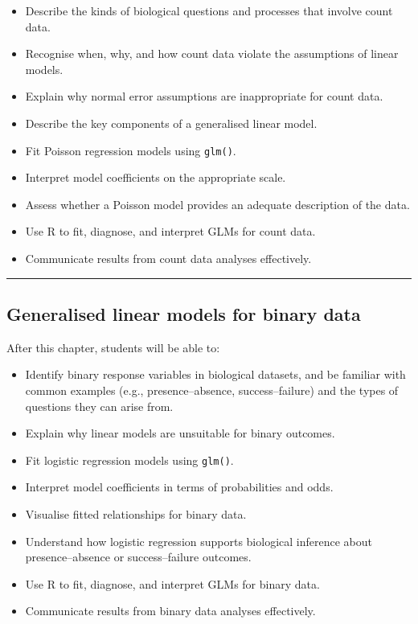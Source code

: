 \documentclass[
  letterpaper,
  8pt,
  a4paper]{book}
\providecommand{\tightlist}{%
  \setlength{\itemsep}{0pt}\setlength{\parskip}{0pt}}
\begin{document}
\begin{itemize}
\tightlist
\item
  Describe the kinds of biological questions and processes that involve
  count data.
\item
  Recognise when, why, and how count data violate the assumptions of
  linear models.
\item
  Explain why normal error assumptions are inappropriate for count data.
\item
  Describe the key components of a generalised linear model.
\item
  Fit Poisson regression models using \texttt{glm()}.
\item
  Interpret model coefficients on the appropriate scale.
\item
  Assess whether a Poisson model provides an adequate description of the
  data.
\item
  Use R to fit, diagnose, and interpret GLMs for count data.
\item
  Communicate results from count data analyses effectively.
\end{itemize}

\begin{center}\rule{0.5\linewidth}{0.5pt}\end{center}

\subsection*{Generalised linear models for binary
data}\label{generalised-linear-models-for-binary-data}

After this chapter, students will be able to:

\begin{itemize}
\tightlist
\item
  Identify binary response variables in biological datasets, and be
  familiar with common examples (e.g., presence--absence,
  success--failure) and the types of questions they can arise from.
\item
  Explain why linear models are unsuitable for binary outcomes.
\item
  Fit logistic regression models using \texttt{glm()}.
\item
  Interpret model coefficients in terms of probabilities and odds.
\item
  Visualise fitted relationships for binary data.
\item
  Understand how logistic regression supports biological inference about
  presence--absence or success--failure outcomes.
\item
  Use R to fit, diagnose, and interpret GLMs for binary data.
\item
  Communicate results from binary data analyses effectively.
\end{itemize}
\end{document}
